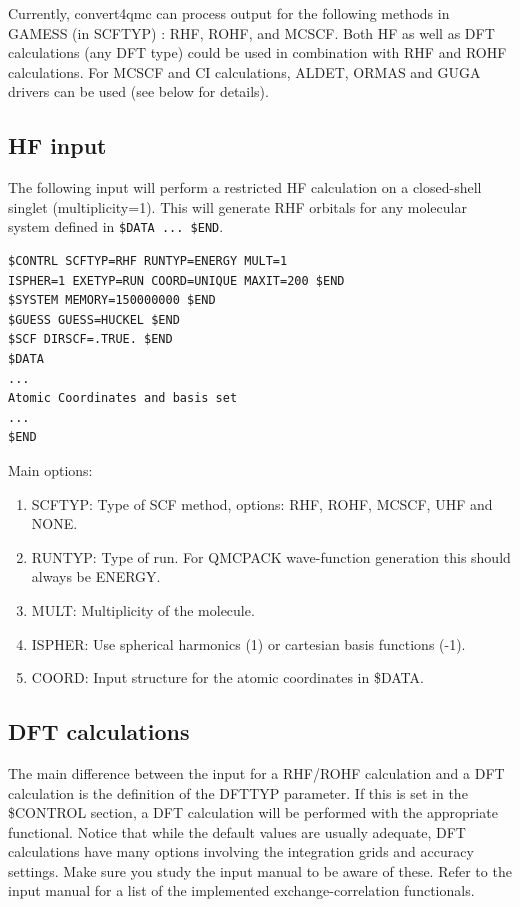Currently, convert4qmc can process output for the following methods in GAMESS (in
SCFTYP) : RHF, ROHF, and MCSCF. Both HF as well as DFT calculations (any DFT
type) could be used in combination with RHF and ROHF calculations. For MCSCF and CI
calculations, ALDET, ORMAS and GUGA drivers can be used (see below for details).


\subsection{HF input}
The following input will perform a restricted HF calculation on a closed-shell singlet 
(multiplicity=1). This will generate RHF orbitals for any molecular system defined in 
\texttt{\$DATA ... \$END}.

\begin{lstlisting}
$CONTRL SCFTYP=RHF RUNTYP=ENERGY MULT=1
ISPHER=1 EXETYP=RUN COORD=UNIQUE MAXIT=200 $END
$SYSTEM MEMORY=150000000 $END
$GUESS GUESS=HUCKEL $END
$SCF DIRSCF=.TRUE. $END
$DATA
...
Atomic Coordinates and basis set
...
$END
\end{lstlisting}

Main options:
\begin{enumerate}
  \item{SCFTYP: Type of SCF method, options: RHF, ROHF, MCSCF, UHF and NONE.}
  \item{RUNTYP: Type of run. For QMCPACK wave-function generation this should always be ENERGY.}
  \item{MULT: Multiplicity of the molecule.}
  \item{ISPHER: Use spherical harmonics (1) or cartesian basis functions (-1).}
  \item{COORD: Input structure for the atomic coordinates in \$DATA.}
\end{enumerate}


\subsection{DFT calculations}
The main difference between the input for a RHF/ROHF calculation and a DFT calculation 
is the definition of the DFTTYP parameter. If this is set in the \$CONTROL
section, a DFT calculation will be performed with the appropriate functional. Notice that
while the default values are usually adequate, DFT calculations have many options involving
the integration grids and accuracy settings. Make sure you study the input manual to be
aware of these. Refer to the input manual for a list of the implemented exchange-correlation
functionals.


